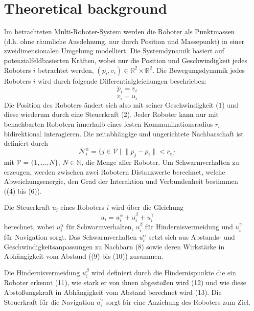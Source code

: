 \documentclass[conference]{IEEEtran}
\begin{document}
\section{Theoretical background}
Im betrachteten Multi-Roboter-System werden die Roboter als Punktmassen 
(d.h. ohne räumliche Ausdehnung, nur durch Position und Massepunkt) in einer 
zweidimensionalen Umgebung modelliert. Die Systemdynamik basiert auf potenzialfeldbasierten 
Kräften, wobei nur die Position und Geschwindigkeit jedes Roboters $i$ betrachtet werden,
$(p_i, v_i) \in \mathbb{R}^2 \times \mathbb{R}^2$.
Die Bewegungsdynamik jedes Roboters $i$ wird durch folgende Differentialgleichungen beschrieben:
\begin{equation}
    \dot{p}_i = v_i
    \label{eq:1}
\end{equation}
\begin{equation}
    \dot{v}_i = u_i
    \label{eq:2}
\end{equation}
Die Position des Roboters ändert sich also mit seiner Geschwindigkeit (1) und diese wiederum 
durch eine Steuerkraft (2).
Jeder Roboter kann nur mit benachbarten Robotern innerhalb eines festen 
Kommunikationsradius $r_c$ bidirektional interagieren. Die zeitabhängige und ungerichtete 
Nachbarschaft ist definiert durch
\begin{equation}
    \mathcal{N}_i^\alpha = \{ j \in \mathcal{V} \; | \; \| p_j - p_i \| < r_c \}
    \label{eq:3}
\end{equation}
mit $\mathcal{V} = \{1, \ldots, N\},\ N \in \mathbb{N}$, die Menge aller Roboter.
Um Schwarmverhalten zu erzeugen, werden zwischen zwei Robotern Distanzwerte berechnet, 
welche Abweichungsenergie, den Grad der Interaktion und Verbundenheit bestimmen ((4) bis (6)).

Die Steuerkraft $u_i$ eines Roboters $i$ wird über die Gleichung
\begin{equation}
    u_i = u_i^\alpha + u_i^\beta + u_i^\gamma
    \label{eq:4}
\end{equation}
berechnet, wobei $u_i^\alpha$ für Schwarmverhalten, $u_i^\beta$ für 
Hindernisvermeidung und $u_i^\gamma$ für Navigation sorgt. Das Schwarmverhalten 
$u_i^\alpha$ setzt sich aus Abstands- und Geschwindigkeitsanpassungen zu Nachbarn (8) 
sowie deren Wirkstärke in Abhängigkeit vom Abstand ((9) bis (10)) zusammen.

Die Hindernisvermeidung $u_i^\beta$ wird definiert durch die Hindernispunkte 
die ein Roboter erkennt (11), wie stark er von ihnen 
abgestoßen wird (12) und wie diese Abstoßungskraft in Abhängigkeit vom Abstand 
berechnet wird (13). Die Steuerkraft für die Navigation $u_i^\gamma$ sorgt für eine Anziehung
des Roboters zum Ziel.
\end{document}
